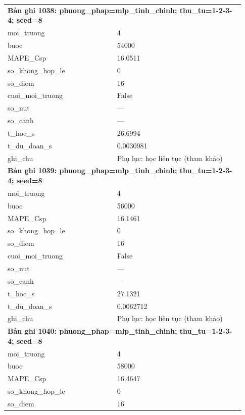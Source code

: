 \begin{longtable}{p{0.43\linewidth}p{0.50\linewidth}}
\midrule
\multicolumn{2}{p{0.95\linewidth}}{\textbf{Bản ghi 1038: phuong\_phap=mlp\_tinh\_chinh; thu\_tu=1-2-3-4; seed=8}} \\
moi\_\allowbreak truong & 4 \\
buoc & 54000 \\
MAPE\_\allowbreak Csp & 16.0511 \\
so\_\allowbreak khong\_\allowbreak hop\_\allowbreak le & 0 \\
so\_\allowbreak diem & 16 \\
cuoi\_\allowbreak moi\_\allowbreak truong & False \\
so\_\allowbreak nut & — \\
so\_\allowbreak canh & — \\
t\_\allowbreak hoc\_\allowbreak s & 26.6994 \\
t\_\allowbreak du\_\allowbreak doan\_\allowbreak s & 0.0030981 \\
ghi\_\allowbreak chu & Phụ lục: học liên tục (tham khảo) \\
\midrule
\multicolumn{2}{p{0.95\linewidth}}{\textbf{Bản ghi 1039: phuong\_phap=mlp\_tinh\_chinh; thu\_tu=1-2-3-4; seed=8}} \\
moi\_\allowbreak truong & 4 \\
buoc & 56000 \\
MAPE\_\allowbreak Csp & 16.1461 \\
so\_\allowbreak khong\_\allowbreak hop\_\allowbreak le & 0 \\
so\_\allowbreak diem & 16 \\
cuoi\_\allowbreak moi\_\allowbreak truong & False \\
so\_\allowbreak nut & — \\
so\_\allowbreak canh & — \\
t\_\allowbreak hoc\_\allowbreak s & 27.1321 \\
t\_\allowbreak du\_\allowbreak doan\_\allowbreak s & 0.0062712 \\
ghi\_\allowbreak chu & Phụ lục: học liên tục (tham khảo) \\
\midrule
\multicolumn{2}{p{0.95\linewidth}}{\textbf{Bản ghi 1040: phuong\_phap=mlp\_tinh\_chinh; thu\_tu=1-2-3-4; seed=8}} \\
moi\_\allowbreak truong & 4 \\
buoc & 58000 \\
MAPE\_\allowbreak Csp & 16.4647 \\
so\_\allowbreak khong\_\allowbreak hop\_\allowbreak le & 0 \\
so\_\allowbreak diem & 16 \\

\end{longtable}
